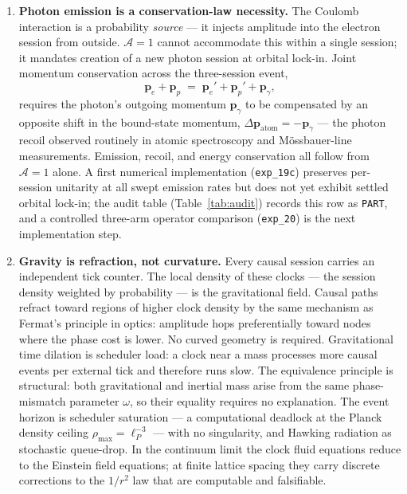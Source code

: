 \begin{enumerate}
\item \textbf{Photon emission is a conservation-law necessity.}
    The Coulomb interaction is a probability \emph{source} --- it injects
    amplitude into the electron session from outside.
    $\mathcal{A}=1$ cannot accommodate this within a single session;
    it mandates creation of a new photon session at orbital lock-in.
    Joint momentum conservation across the three-session event,
    \begin{equation*}
      \mathbf{p}_e + \mathbf{p}_p \;=\; \mathbf{p}_e' + \mathbf{p}_p' + \mathbf{p}_\gamma,
    \end{equation*}
    requires the photon's outgoing momentum $\mathbf{p}_\gamma$ to be
    compensated by an opposite shift in the bound-state momentum,
    $\Delta\mathbf{p}_\text{atom} = -\mathbf{p}_\gamma$ --- the photon
    recoil observed routinely in atomic spectroscopy and
    M\"ossbauer-line measurements.
    Emission, recoil, and energy conservation all follow from
    $\mathcal{A}=1$ alone.
    A first numerical implementation (\texttt{exp\_19c}) preserves
    per-session unitarity at all swept emission rates but does not yet
    exhibit settled orbital lock-in; the audit table
    (Table~\ref{tab:audit}) records this row as \texttt{PART}, and a
    controlled three-arm operator comparison (\texttt{exp\_20}) is the
    next implementation step.

\item \textbf{Gravity is refraction, not curvature.}
    Every causal session carries an independent tick counter.
    The local density of these clocks --- the session density weighted by
    probability --- is the gravitational field.
    Causal paths refract toward regions of higher clock density by the
    same mechanism as Fermat's principle in optics: amplitude hops
    preferentially toward nodes where the phase cost is lower.
    No curved geometry is required.
    Gravitational time dilation is scheduler load: a clock near a mass
    processes more causal events per external tick and therefore runs
    slow.
    The equivalence principle is structural: both gravitational and
    inertial mass arise from the same phase-mismatch parameter $\omega$,
    so their equality requires no explanation.
    The event horizon is scheduler saturation --- a computational
    deadlock at the Planck density ceiling $\rho_\text{max} =
    \ell_P^{-3}$ --- with no singularity, and Hawking radiation as
    stochastic queue-drop.
    In the continuum limit the clock fluid equations reduce to the
    Einstein field equations; at finite lattice spacing they carry
    discrete corrections to the $1/r^2$ law that are computable and
    falsifiable.
\end{enumerate}

